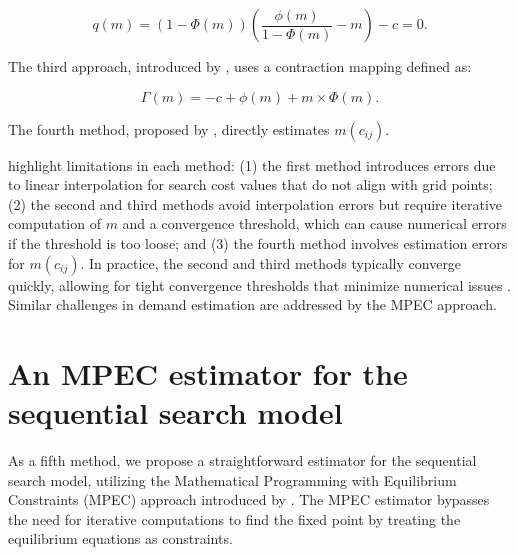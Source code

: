 \documentclass[12pt]{article}
\begin{document}
\[
    q(m) = (1-\Phi(m))\left(\frac{\phi(m)}{1-\Phi(m)} - m\right) - c = 0.
\]

The third approach, introduced by \cite{elberg2019dynamic}, uses a contraction mapping defined as:

\[
    \Gamma(m) = -c + \phi(m) + m \times \Phi(m).
\]

The fourth method, proposed by \cite{morozov2023measuring}, directly estimates \( m(c_{ij}) \).

\cite{ursu2023sequential} highlight limitations in each method: (1) the first method introduces errors due to linear interpolation for search cost values that do not align with grid points; (2) the second and third methods avoid interpolation errors but require iterative computation of \( m \) and a convergence threshold, which can cause numerical errors if the threshold is too loose; and (3) the fourth method involves estimation errors for \( m(c_{ij}) \). In practice, the second and third methods typically converge quickly, allowing for tight convergence thresholds that minimize numerical issues \citep{ursu2023sequential}. Similar challenges in demand estimation are addressed by the MPEC approach.



\section{An MPEC estimator for the sequential search model}
As a fifth method, we propose a straightforward estimator for the sequential search model, utilizing the Mathematical Programming with Equilibrium Constraints (MPEC) approach introduced by \cite{su2012constrained}. 
The MPEC estimator bypasses the need for iterative computations to find the fixed point by treating the equilibrium equations as constraints.
\end{document}
